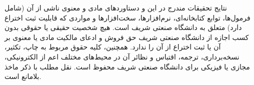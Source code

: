 {%
\vspace{0.4em}
\noindent\hspace*{\fill}%
\begin{minipage}[t]{6.5cm}
  \begin{flushright}
  \end{flushright}
\end{minipage}

\vspace{1.1cm}
نتایج تحقیقات مندرج در این \ThesisType{} و دستاوردهای مادی و معنوی ناشی از آن (شامل فرمول‌ها، توابع کتابخانه‌ای، نرم‌افزارها، سخت‌افزارها و مواردی که قابلیت ثبت اختراع دارد) متعلق به دانشگاه صنعتی شریف است. هیچ شخصیت حقیقی یا حقوقی بدون کسب اجازه از دانشگاه صنعتی شریف حق فروش و ادعای مالکیت مادی یا معنوی بر آن یا ثبت اختراع از آن را ندارد. همچنین، کلیه حقوق مربوط به چاپ، تکثیر، نسخه‌برداری، ترجمه، اقتباس و نظائر آن در محیط‌های مختلف اعم از الکترونیکی، مجازی یا فیزیکی برای دانشگاه صنعتی شریف محفوظ است. نقل مطلب با ذکر ماخذ بلامانع است.

\vspace{1.2em}
\noindent
\begin{minipage}[t]{6.5cm}
\end{minipage}%
\hspace{0.95em}%
\begin{minipage}[t]{6.5cm}
  \begin{flushleft}
  \end{flushleft}
\end{minipage}
}
